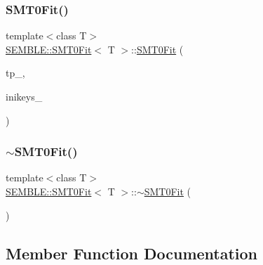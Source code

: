 \mbox{\label{structSEMBLE_1_1SMT0Fit_a048a03a78f499dc1186691afc5ff770d}} 
\subsubsection{\texorpdfstring{SMT0Fit()}{SMT0Fit()}\hspace{0.1cm}{\footnotesize\ttfamily [8/8]}}
{\footnotesize\ttfamily template$<$class T$>$ \\
\mbox{\hyperlink{structSEMBLE_1_1SMT0Fit}{S\+E\+M\+B\+L\+E\+::\+S\+M\+T0\+Fit}}$<$ T $>$\+::\mbox{\hyperlink{structSEMBLE_1_1SMT0Fit}{S\+M\+T0\+Fit}} (\begin{DoxyParamCaption}\item[{const typename std\+::vector$<$ \mbox{\hyperlink{structSEMBLE_1_1SembleMatrix}{Semble\+Matrix}}$<$ T $>$ $>$ \&}]{tp\+\_\+,  }\item[{const Fit\+Ini\+Props\+\_\+t \&}]{inikeys\+\_\+ }\end{DoxyParamCaption})}

\mbox{\label{structSEMBLE_1_1SMT0Fit_af661fa33d8fba83dbbc1f08f4c15c04e}} 
\subsubsection{\texorpdfstring{$\sim$SMT0Fit()}{~SMT0Fit()}\hspace{0.1cm}{\footnotesize\ttfamily [2/2]}}
{\footnotesize\ttfamily template$<$class T$>$ \\
\mbox{\hyperlink{structSEMBLE_1_1SMT0Fit}{S\+E\+M\+B\+L\+E\+::\+S\+M\+T0\+Fit}}$<$ T $>$\+::$\sim$\mbox{\hyperlink{structSEMBLE_1_1SMT0Fit}{S\+M\+T0\+Fit}} (\begin{DoxyParamCaption}\item[{void}]{ }\end{DoxyParamCaption})\hspace{0.3cm}{\ttfamily [inline]}}



\subsection{Member Function Documentation}
\mbox{\label{structSEMBLE_1_1SMT0Fit_af7fdbb36395ef2aa852a7735405b3421}} 
